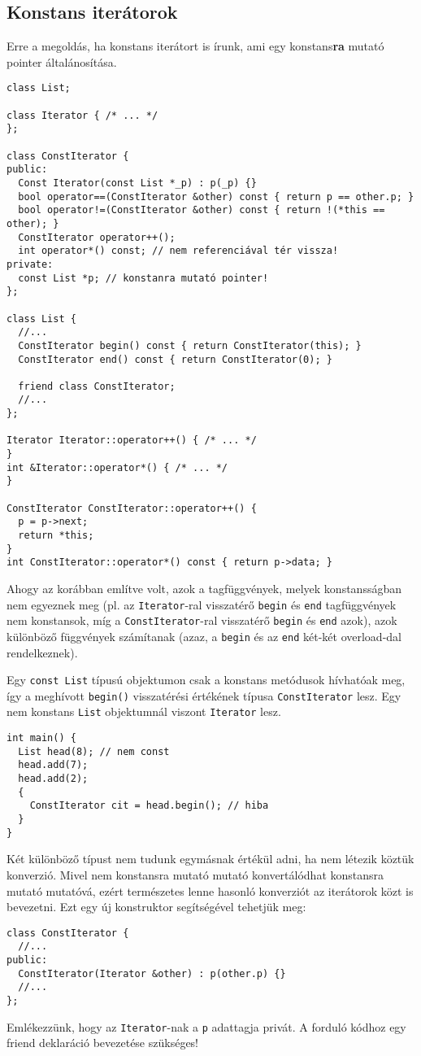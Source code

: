 \documentclass[../cpp_book/cpp_book.tex]{subfiles}
\begin{document}
	\subsection{Konstans iterátorok}
	Erre a megoldás, ha konstans iterátort is írunk, ami egy konstans\textbf{ra} mutató pointer általánosítása.
\begin{lstlisting}
class List;

class Iterator { /* ... */
};

class ConstIterator {
public:
  Const Iterator(const List *_p) : p(_p) {}
  bool operator==(ConstIterator &other) const { return p == other.p; }
  bool operator!=(ConstIterator &other) const { return !(*this == other); }
  ConstIterator operator++();
  int operator*() const; // nem referenciával tér vissza!
private:
  const List *p; // konstanra mutató pointer!
};

class List {
  //...
  ConstIterator begin() const { return ConstIterator(this); }
  ConstIterator end() const { return ConstIterator(0); }

  friend class ConstIterator;
  //...
};

Iterator Iterator::operator++() { /* ... */
}
int &Iterator::operator*() { /* ... */
}

ConstIterator ConstIterator::operator++() {
  p = p->next;
  return *this;
}
int ConstIterator::operator*() const { return p->data; }
\end{lstlisting}
	\begin{note}
		Ahogy az korábban említve volt, azok a tagfüggvények, melyek konstansságban nem egyeznek meg (pl. az \texttt{Iterator}-ral visszatérő \texttt{begin} és \texttt{end} tagfüggvények nem konstansok, míg a \texttt{ConstIterator}-ral visszatérő \texttt{begin} és \texttt{end} azok), azok különböző függvények számítanak (azaz, a \texttt{begin} és az \texttt{end} két-két overload-dal rendelkeznek).
	\end{note}
	Egy \texttt{const List} típusú objektumon csak a konstans metódusok hívhatóak meg, így a meghívott \texttt{begin()} visszatérési értékének típusa \texttt{ConstIterator} lesz. Egy nem konstans \texttt{List} objektumnál viszont \texttt{Iterator} lesz.
	\begin{lstlisting}
int main() {
  List head(8); // nem const
  head.add(7);
  head.add(2);
  {
    ConstIterator cit = head.begin(); // hiba
  }
}
	\end{lstlisting}
	Két különböző típust nem tudunk egymásnak értékül adni, ha nem létezik köztük konverzió. Mivel nem konstansra mutató mutató konvertálódhat konstansra mutató mutatóvá, ezért természetes lenne hasonló konverziót az iterátorok közt is bevezetni. Ezt egy új konstruktor segítségével tehetjük meg:
	\begin{lstlisting}
class ConstIterator {
  //...
public:
  ConstIterator(Iterator &other) : p(other.p) {}
  //...
};
	\end{lstlisting}
	Emlékezzünk, hogy az \texttt{Iterator}-nak a \texttt{p} adattagja privát. A forduló kódhoz egy friend deklaráció bevezetése szükséges!
	
\end{document}
